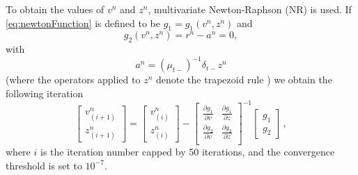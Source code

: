     To obtain the values of $v^n$ and $z^n$, multivariate Newton-Raphson (NR) is used. If \eqref{eq:newtonFunction} is defined to be $g_1  = g_1(v^n, z^n)$ and 
    \begin{equation}\label{eq:g2}
       g_2(v^n, z^n) = r^n - a^n = 0,
    \end{equation}
    with
    \begin{equation}\label{eq:an}
        a^n = (\mu_{t-})^{-1}\delta_{t-} z^n
    \end{equation}
    (where the operators applied to $z^n$ denote the trapezoid rule \cite{Bilbao2009}) we obtain the following iteration 
    \begin{equation}\label{eq:NRit}
        \begin{bmatrix}
        v_{(i+1)}^n\\
        z_{(i+1)}^n
        \end{bmatrix}
        =
        \begin{bmatrix}
        v_{(i)}^n\\
        z_{(i)}^n
        \end{bmatrix}
        -
        \begin{bmatrix}
        \frac{\partial g_1}{\partial v} & \frac{\partial g_1}{\partial z}\\
        \frac{\partial g_2}{\partial v} & \frac{\partial g_2}{\partial z}\\
        \end{bmatrix}^{-1}
        \begin{bmatrix}
        g_1\\
        g_2
        \end{bmatrix}\,
        ,
    \end{equation}
    where $i$ is the iteration number capped by 50 iterations, and the convergence threshold is set to $10^{-7}$.
    
